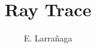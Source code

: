 \documentclass{book}
\begin{document}
\title{Ray Trace}
\author{E. Larra\~{n}aga}

\maketitle



\end{document}
